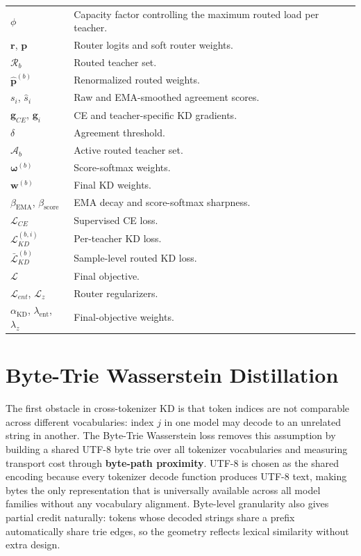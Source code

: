 {\begin{longtable}{@{}>{\raggedright\arraybackslash}p{}p{}@{}}
\(\phi\) & Capacity factor controlling the maximum routed load per teacher. \\
\(\mathbf{r}\), \(\mathbf{p}\) & Router logits and soft router weights. \\
\(\mathcal{R}_b\) & Routed teacher set. \\
\(\hat{\mathbf{p}}^{(b)}\) & Renormalized routed weights. \\
\addlinespace[4pt]
\(s_i\), \(\hat{s}_i\) & Raw and EMA-smoothed agreement scores. \\
\(\mathbf{g}_{CE}\), \(\mathbf{g}_i\) & CE and teacher-specific KD gradients. \\
\(\delta\) & Agreement threshold. \\
\(\mathcal{A}_b\) & Active routed teacher set. \\
\(\boldsymbol{\omega}^{(b)}\) & Score-softmax weights. \\
\(\mathbf{w}^{(b)}\) & Final KD weights. \\
\(\beta_{\mathrm{EMA}}\), \(\beta_{\mathrm{score}}\) & EMA decay and score-softmax sharpness. \\
\addlinespace[4pt]
\(\mathcal{L}_{CE}\) & Supervised CE loss. \\
\(\mathcal{L}_{KD}^{(b,i)}\) & Per-teacher KD loss. \\
\(\bar{\mathcal{L}}_{KD}^{(b)}\) & Sample-level routed KD loss. \\
\(\mathcal{L}\) & Final objective. \\
\(\mathcal{L}_{ent}\), \(\mathcal{L}_{z}\) & Router regularizers. \\
\(\alpha_{\mathrm{KD}}\), \(\lambda_{\mathrm{ent}}\), \(\lambda_z\) & Final-objective weights. \\
\bottomrule
\end{longtable}
}

\FloatBarrier

\section{Byte-Trie Wasserstein Distillation}
\label{sec:byte-trie-wasserstein-distillation}

The first obstacle in cross-tokenizer KD is that token indices are not
comparable across different vocabularies: index \(j\) in one model may decode
to an unrelated string in another. The Byte-Trie Wasserstein loss removes this
assumption by building a shared UTF-8 byte trie over all tokenizer vocabularies
and measuring transport cost through \textbf{byte-path proximity}.
UTF-8 is chosen as the shared encoding because every tokenizer decode function
produces UTF-8 text, making bytes the only representation that is
universally available across all model families without any vocabulary
alignment. Byte-level granularity also gives partial credit naturally:
tokens whose decoded strings share a prefix automatically share trie edges,
so the geometry reflects lexical similarity without extra design.


